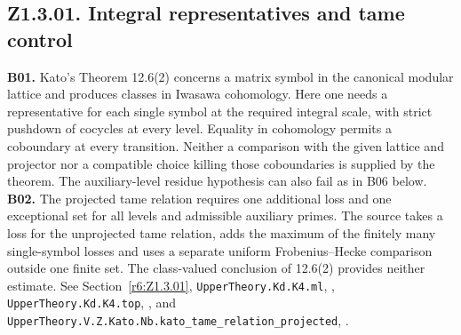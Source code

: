 \subsection{Z1.3.01. Integral representatives and tame control}\label{r7:Z1.3.01}
\textbf{B01.} Kato's Theorem 12.6(2) concerns a matrix symbol in the
canonical modular lattice and produces classes in Iwasawa cohomology.
Here one needs a representative for each single symbol at the required
integral scale, with strict pushdown of cocycles at every level.
Equality in cohomology permits a coboundary at every transition.
Neither a comparison with the given lattice and projector nor a compatible
choice killing those coboundaries is supplied by the theorem. The
auxiliary-level residue hypothesis can also fail as in B06 below.
\textbf{B02.} The projected tame relation requires one additional loss
and one exceptional set for all levels and admissible auxiliary primes.
The source takes a loss for the unprojected tame relation, adds the
maximum of the finitely many single-symbol losses and uses a separate
uniform Frobenius--Hecke comparison outside one finite set. The
class-valued conclusion of 12.6(2) provides neither estimate.
See Section~\ref{r6:Z1.3.01}, \nolinkurl{UpperTheory.Kd.K4.ml},
, \nolinkurl{UpperTheory.Kd.K4.top},
, and
\nolinkurl{UpperTheory.V.Z.Kato.Nb.kato_tame_relation_projected},
.

